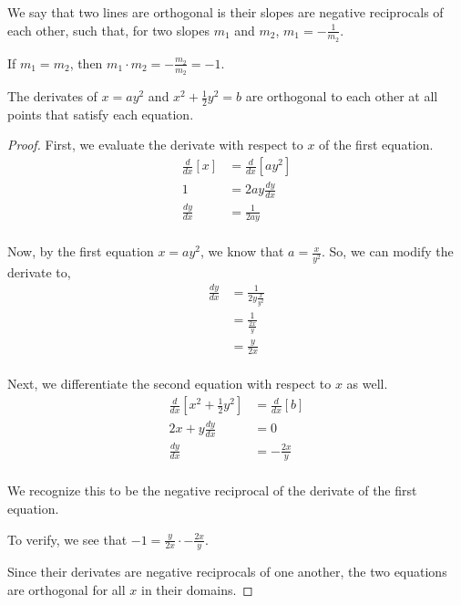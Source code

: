 \documentclass[../hw3.tex]{subfiles}
\begin{document}
We say that two lines are orthogonal is their slopes are negative reciprocals of each other, such that, for two slopes $m_1$ and $m_2$, $m_1 = -\frac{1}{m_2}$.

If $m_1 = m_2$, then $m_1 \cdot m_2 = -\frac{m_2}{m_2} = -1$.

\begin{proposition}
    The derivates of $x=ay^2$ and $x^2+\frac{1}{2}y^2 = b$ are orthogonal to each other at all points that satisfy each equation.
\end{proposition}

\begin{proof}
    First, we evaluate the derivate with respect to $x$ of the first equation.
    \begin{align*}
        \frac{d}{dx}\left[x\right]&=\frac{d}{dx}\left[ay^2 \right] \\
        1& = 2ay \frac{dy}{dx} \\
        \frac{dy}{dx} &= \frac{1}{2ay} \\
    \end{align*}

    Now, by the first equation $x=ay^2$, we know that $a=\frac{x}{y^2}$. So, we can modify the derivate to,
    \begin{align*}
        \frac{dy}{dx} &= \frac{1}{2y \frac{x}{y^2}} \\
        &= \frac{1}{\frac{2x}{y}} \\
        &= \frac{y}{2x} \\
    \end{align*}

    Next, we differentiate the second equation with respect to $x$ as well.
    \begin{align*}
        \frac{d}{dx} \left[ x^2+\frac{1}{2}y^2 \right] &= \frac{d}{dx} \left[ b \right] \\
        2x+y \frac{dy}{dx} &=0 \\
        \frac{dy}{dx} &= -\frac{2x}{y} \\
    \end{align*}

    We recognize this to be the negative reciprocal of the derivate of the first equation.

    To verify, we see that $-1 = \frac{y}{2x} \cdot -\frac{2x}{y}$.

    Since their derivates are negative reciprocals of one another, the two equations are orthogonal for all $x$ in their domains.

\end{proof}
\end{document}
